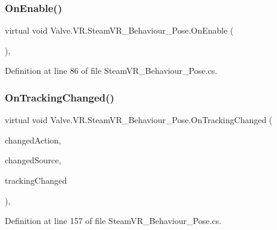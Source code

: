 \subsubsection{\texorpdfstring{OnEnable()}{OnEnable()}}
{\footnotesize\ttfamily virtual void Valve.\+V\+R.\+Steam\+V\+R\+\_\+\+Behaviour\+\_\+\+Pose.\+On\+Enable (\begin{DoxyParamCaption}{ }\end{DoxyParamCaption})\hspace{0.3cm}{\ttfamily [protected]}, {\ttfamily [virtual]}}



Definition at line 86 of file Steam\+V\+R\+\_\+\+Behaviour\+\_\+\+Pose.\+cs.

\mbox{\label{class_valve_1_1_v_r_1_1_steam_v_r___behaviour___pose_a5f7af5e04519b2f061b96aaba64035b4}} 
\subsubsection{\texorpdfstring{OnTrackingChanged()}{OnTrackingChanged()}}
{\footnotesize\ttfamily virtual void Valve.\+V\+R.\+Steam\+V\+R\+\_\+\+Behaviour\+\_\+\+Pose.\+On\+Tracking\+Changed (\begin{DoxyParamCaption}\item[{\mbox{\hyperlink{class_valve_1_1_v_r_1_1_steam_v_r___action___pose}{Steam\+V\+R\+\_\+\+Action\+\_\+\+Pose}}}]{changed\+Action,  }\item[{\mbox{\hyperlink{namespace_valve_1_1_v_r_a82e5bf501cc3aa155444ee3f0662853f}{Steam\+V\+R\+\_\+\+Input\+\_\+\+Sources}}}]{changed\+Source,  }\item[{\mbox{\hyperlink{namespace_valve_1_1_v_r_abe6feab98f33191b7c27b4292012e90a}{E\+Tracking\+Result}}}]{tracking\+Changed }\end{DoxyParamCaption})\hspace{0.3cm}{\ttfamily [protected]}, {\ttfamily [virtual]}}



Definition at line 157 of file Steam\+V\+R\+\_\+\+Behaviour\+\_\+\+Pose.\+cs.

\mbox{\label{class_valve_1_1_v_r_1_1_steam_v_r___behaviour___pose_a8a71e7617dd2132c4ef9c1ffcad1697b}} 
